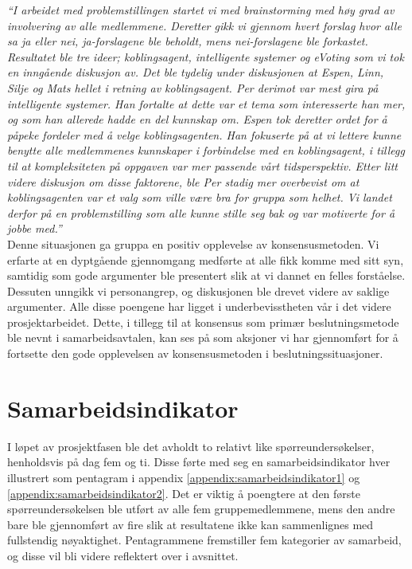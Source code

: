 \textit{``I arbeidet med problemstillingen startet vi med brainstorming med høy grad av involvering av alle medlemmene. Deretter gikk vi gjennom hvert forslag hvor alle sa ja eller nei, ja-forslagene ble beholdt, mens nei-forslagene ble forkastet. Resultatet ble tre ideer; koblingsagent, intelligente systemer og eVoting som vi tok en inngående diskusjon av. Det ble tydelig under diskusjonen at Espen, Linn, Silje og Mats hellet i retning av koblingsagent. Per derimot var mest gira på intelligente systemer. Han fortalte at dette var et tema som interesserte han mer, og som han allerede hadde en del kunnskap om. Espen tok deretter ordet for å påpeke fordeler med å velge koblingsagenten. Han fokuserte på at vi lettere kunne benytte alle medlemmenes kunnskaper i forbindelse med en koblingsagent, i tillegg til at kompleksiteten på oppgaven var mer passende vårt tidsperspektiv. Etter litt videre diskusjon om disse faktorene, ble Per stadig mer overbevist om at koblingsagenten var et valg som ville være bra for gruppa som helhet. Vi landet derfor på en problemstilling som alle kunne stille seg bak og var motiverte for å jobbe med.''}\\

Denne situasjonen ga gruppa en positiv opplevelse av konsensusmetoden. Vi erfarte at en dyptgående gjennomgang medførte at alle fikk komme med sitt syn, samtidig som gode argumenter ble presentert slik at vi dannet en felles forståelse. Dessuten unngikk vi personangrep, og diskusjonen ble drevet videre av saklige argumenter. Alle disse poengene har ligget i underbevisstheten vår i det videre prosjektarbeidet. Dette, i tillegg til at konsensus som primær beslutningsmetode ble nevnt i samarbeidsavtalen, kan ses på som aksjoner vi har gjennomført for å fortsette den gode opplevelsen av konsensusmetoden i beslutningssituasjoner.\\


\section{Samarbeidsindikator}
\label{sec:samarbeidsindikator}
I løpet av prosjektfasen ble det avholdt to relativt like spørreundersøkelser, henholdsvis på dag fem og ti. Disse førte med seg en samarbeidsindikator hver illustrert som pentagram i appendix \ref{appendix:samarbeidsindikator1} og \ref{appendix:samarbeidsindikator2}. Det er viktig å poengtere at den første spørreundersøkelsen ble utført av alle fem gruppemedlemmene, mens den andre bare ble gjennomført av fire slik at resultatene ikke kan sammenlignes med fullstendig nøyaktighet. Pentagrammene fremstiller fem kategorier av samarbeid, og disse vil bli videre reflektert over i avsnittet.\\

